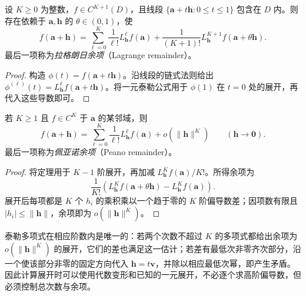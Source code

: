 \documentclass[UTF8,12pt,a4paper,fontset=fandol]{ctexbook}
\begin{document}
\begin{theorem}[带拉格朗日余项的多元泰勒公式]
\label{thm:multivariable-taylor-lagrange-ch14}
设 $K\geq0$ 为整数，$f\in C^{K+1}(D)$，且线段 $\{\boldsymbol a+t\boldsymbol h:0\leq t\leq1\}$ 包含在 $D$ 内。则存在依赖于 $\boldsymbol a,\boldsymbol h$ 的 $\theta\in(0,1)$，使
\begin{equation}
\label{eq:multivariable-taylor-lagrange-ch14}
    f(\boldsymbol a+\boldsymbol h)
    =\sum_{\ell=0}^K\frac1{\ell!}L_{\boldsymbol h}^{\ell}f(\boldsymbol a)
      +\frac1{(K+1)!}L_{\boldsymbol h}^{K+1}f(\boldsymbol a+\theta\boldsymbol h).
\end{equation}
最后一项称为\emph{拉格朗日余项}（Lagrange remainder）。
\end{theorem}
\begin{proof}
构造 $\phi(t)=f(\boldsymbol a+t\boldsymbol h)$。沿线段的链式法则给出 $\phi^{(\ell)}(t)=L_{\boldsymbol h}^{\ell}f(\boldsymbol a+t\boldsymbol h)$。将一元泰勒公式用于 $\phi(1)$ 在 $t=0$ 处的展开，再代入这些导数即可。
\end{proof}

\begin{corollary}[带佩亚诺余项的多元泰勒公式]
\label{cor:multivariable-taylor-peano-ch14}
若 $K\geq1$ 且 $f\in C^K$ 于 $\boldsymbol a$ 的某邻域，则
\begin{equation}
\label{eq:multivariable-taylor-peano-ch14}
    f(\boldsymbol a+\boldsymbol h)
    =\sum_{\ell=0}^K\frac1{\ell!}L_{\boldsymbol h}^{\ell}f(\boldsymbol a)
       +o(\|\boldsymbol h\|^K)\qquad(\boldsymbol h\to\boldsymbol0).
\end{equation}
最后一项称为\emph{佩亚诺余项}（Peano remainder）。
\end{corollary}
\begin{proof}
将定理用于 $K-1$ 阶展开，再加减 $L_{\boldsymbol h}^Kf(\boldsymbol a)/K!$。所得余项为
\[
    \frac1{K!}\left(
       L_{\boldsymbol h}^Kf(\boldsymbol a+\theta\boldsymbol h)
       -L_{\boldsymbol h}^Kf(\boldsymbol a)\right).
\]
展开后每项都是 $K$ 个 $h_i$ 的乘积乘以一个趋于零的 $K$ 阶偏导数差；因项数有限且 $|h_i|\leq\|\boldsymbol h\|$，余项即为 $o(\|\boldsymbol h\|^K)$。
\end{proof}

泰勒多项式在相应阶数内是唯一的：若两个次数不超过 $K$ 的多项式都给出余项为 $o(\|\boldsymbol h\|^K)$ 的展开，它们的差也满足这一估计；若差有最低次非零齐次部分，沿一个使该部分非零的固定方向代入 $\boldsymbol h=t\boldsymbol v$，并除以相应最低次幂，即产生矛盾。因此计算展开时可以使用代数变形和已知的一元展开，不必逐个求高阶偏导数，但必须控制总次数与余项。
\end{document}
